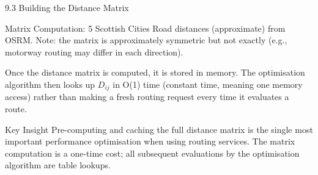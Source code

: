 \documentclass[aspectratio=169,10pt]{beamer}
\begin{document}
\begin{frame}[allowframebreaks]{9.3 Building the Distance Matrix}
\begin{exampleblock}{Matrix Computation: 5 Scottish Cities}
    \medskip
    \small Road distances (approximate) from OSRM.
    Note: the matrix is approximately symmetric but not exactly
    (e.g., motorway routing may differ in each direction).
  \end{exampleblock}

  \medskip
  Once the distance matrix is computed, it is stored in memory.  The
  optimisation algorithm then looks up $D_{ij}$ in O(1) time (constant
  time, meaning one memory access) rather than making a fresh routing
  request every time it evaluates a route.

  \begin{alertblock}{Key Insight}
    Pre-computing and caching the full distance matrix is the single most
    important performance optimisation when using routing services.  The
    matrix computation is a one-time cost; all subsequent evaluations by
    the optimisation algorithm are table lookups.
  \end{alertblock}

\end{frame}
\end{document}
